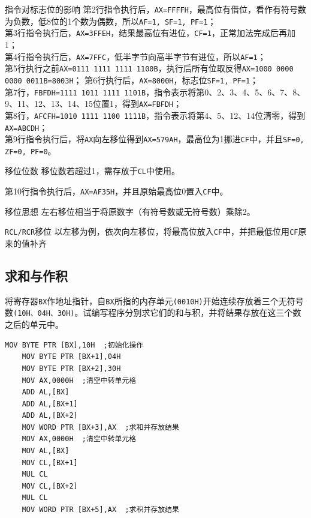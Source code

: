 \documentclass[11pt]{SEU-Digital-Report}
\begin{document}
\begin{analyze}{指令对标志位的影响}{}
    第2行指令执行后，\texttt{AX=FFFFH}，最高位有借位，看作有符号数为负数，低8位的1个数为偶数，所以\texttt{AF=1, SF=1, PF=1}；\\
    第3行指令执行后，\texttt{AX=3FFEH}，结果最高位有进位，\texttt{CF=1}，正常加法完成后再加1；\\
    第4行指令执行后，\texttt{AX=7FFC}，低半字节向高半字节有进位，所以\texttt{AF=1}；\\
    第5行执行之前\texttt{AX=0111 1111 1111 1100B}，执行后所有位取反得\texttt{AX=1000 0000 0000 0011B=8003H}；
    第6行执行后，\texttt{AX=8000H}，标志位\texttt{SF=1, PF=1}；\\
    第7行，\texttt{FBFDH=1111 1011 1111 1101B}，指令表示将第0、2、3、4、5、6、7、8、9、11、12、13、14、15位置1，得到\texttt{AX=FBFDH}；\\
    第8行，\texttt{AFCFH=1010 1111 1100 1111B}，指令表示将第4、5、12、14位清零，得到\texttt{AX=ABCDH}；\\
    第9行指令执行后，将\texttt{AX}向左移位得到\texttt{AX=579AH}，最高位为1挪进\texttt{CF}中，并且\texttt{SF=0, ZF=0, PF=0}。
    \begin{note}{移位位数}
        移位数若超过1，需存放于\texttt{CL}中使用。
    \end{note}
    第10行指令执行后，\texttt{AX=AF35H}，并且原始最高位0置入\texttt{CF}中。
    \begin{idea}{移位思想}
        左右移位相当于将原数字（有符号数或无符号数）乘除2。
    \end{idea}
    \begin{note}{\texttt{RCL/RCR}移位}
        以左移为例，依次向左移位，将最高位放入\texttt{CF}中，并把最低位用\texttt{CF}原来的值补齐
    \end{note}
\end{analyze}

\subsection{求和与作积}
将寄存器\texttt{BX}作地址指针，自\texttt{BX}所指的内存单元\texttt{(0010H)}开始连续存放着三个无符号数\texttt{(10H、04H、30H)}。试编写程序分别求它们的和与积，并将结果存放在这三个数之后的单元中。
\begin{lstlisting}[language={[x86masm]Assembler},title=code]
    MOV BYTE PTR [BX],10H  ;初始化操作
    MOV BYTE PTR [BX+1],04H
    MOV BYTE PTR [BX+2],30H
    MOV AX,0000H  ;清空中转单元格
    ADD AL,[BX]
    ADD AL,[BX+1]
    ADD AL,[BX+2]
    MOV WORD PTR [BX+3],AX  ;求和并存放结果
    MOV AX,0000H  ;清空中转单元格
    MOV AL,[BX]
    MOV CL,[BX+1]
    MUL CL
    MOV CL,[BX+2]
    MUL CL
    MOV WORD PTR [BX+5],AX  ;求积并存放结果
\end{lstlisting}
\end{document}
